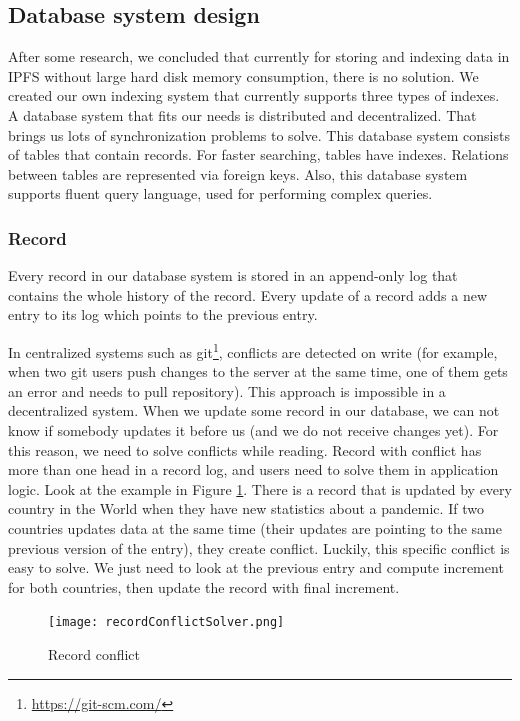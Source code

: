 \subsection{Database system design}
After some research, we concluded that currently for storing and indexing data in IPFS without large hard disk memory consumption, there is no solution. We created our own indexing system that currently supports three types of indexes. A database system that fits our needs is distributed and decentralized. That brings us lots of synchronization problems to solve. This database system consists of tables that contain records. For faster searching, tables have indexes. Relations between tables are represented via foreign keys. Also, this database system supports fluent query language, used for performing complex queries.

\subsubsection{Record} 
Every record in our database system is stored in an append-only log that contains the whole history of the record. Every update of a record adds a new entry to its log which points to the previous entry. 

In centralized systems such as git\footnote{\url{https://git-scm.com/}}, conflicts are detected on write (for example, when two git users push changes to the server at the same time, one of them gets an error and needs to pull repository)\cite{chacon2014pro}. This approach is impossible in a decentralized system. When we update some record in our database, we can not know if somebody updates it before us (and we do not receive changes yet). For this reason, we need to solve conflicts while reading. Record with conflict has more than one head in a record log, and users need to solve them in application logic. Look at the example in Figure \ref{recordConflict}. There is a record that is updated by every country in the World when they have new statistics about a pandemic. If two countries updates data at the same time (their updates are pointing to the same previous version of the entry), they create conflict. Luckily, this specific conflict is easy to solve. We just need to look at the previous entry and compute increment for both countries, then update the record with final increment.


\begin{figure}[h]
    \centering
    \texttt{[image: recordConflictSolver.png]}
    \caption{Record conflict}
    \label{recordConflict}
\end{figure}


